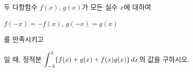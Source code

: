 두 다항함수 $f(x)$, $g(x)$가 모든 실수 $x$에 대하여 \par\smallskip\noindent\hspace*{1.5em}$f(-x)=-f(x)$, $g(-x)=g(x)$\par\smallskip\noindent 를 만족시키고 \par\smallskip{}\par\smallskip\noindent 일 때, 정적분 $\displaystyle\int_{-3}^{3}\{f(x)+g(x)+f(x)g(x)\}\mkern3mu dx$의 값을 구하시오.
